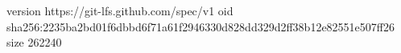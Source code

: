 version https://git-lfs.github.com/spec/v1
oid sha256:2235ba2bd01f6dbbd6f71a61f2946330d828dd329d2ff38b12e82551e507ff26
size 262240
